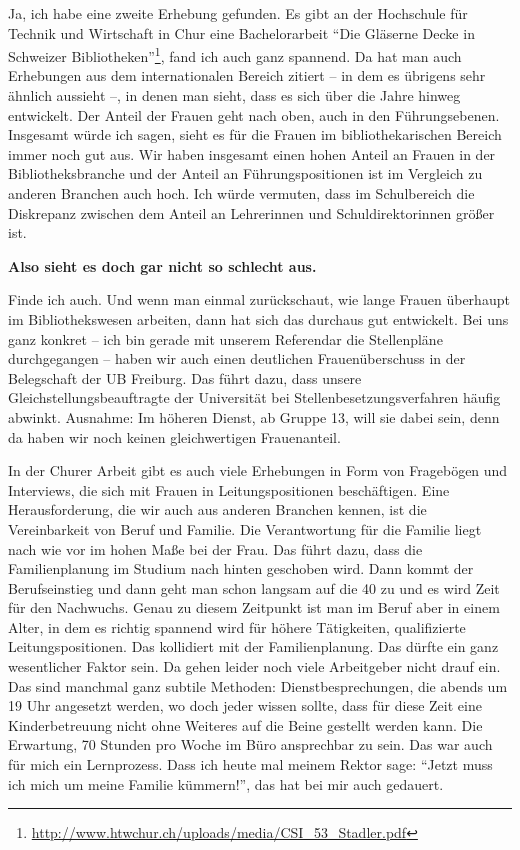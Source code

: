 \documentclass[a4paper,
fontsize=11pt,
oneside,
numbers=noperiodatend,
parskip=half-,
bibliography=totoc,
final
]{scrartcl}
\begin{document}
Ja, ich habe eine zweite Erhebung gefunden. Es gibt an der Hochschule
für Technik und Wirtschaft in Chur eine Bachelorarbeit \enquote{Die
Gläserne Decke in Schweizer Bibliotheken}\footnote{\url{http://www.htwchur.ch/uploads/media/CSI_53_Stadler.pdf}},
fand ich auch ganz spannend. Da hat man auch Erhebungen aus dem
internationalen Bereich zitiert -- in dem es übrigens sehr ähnlich
aussieht --, in denen man sieht, dass es sich über die Jahre hinweg
entwickelt. Der Anteil der Frauen geht nach oben, auch in den
Führungsebenen. Insgesamt würde ich sagen, sieht es für die Frauen im
bibliothekarischen Bereich immer noch gut aus. Wir haben insgesamt einen
hohen Anteil an Frauen in der Bibliotheksbranche und der Anteil an
Führungspositionen ist im Vergleich zu anderen Branchen auch hoch. Ich
würde vermuten, dass im Schulbereich die Diskrepanz zwischen dem Anteil
an Lehrerinnen und Schuldirektorinnen größer ist.

\textbf{Also sieht es doch gar nicht so schlecht aus.}

Finde ich auch. Und wenn man einmal zurückschaut, wie lange Frauen
überhaupt im Bibliothekswesen arbeiten, dann hat sich das durchaus gut
entwickelt. Bei uns ganz konkret -- ich bin gerade mit unserem
Referendar die Stellenpläne durchgegangen -- haben wir auch einen
deutlichen Frauenüberschuss in der Belegschaft der UB Freiburg. Das
führt dazu, dass unsere Gleichstellungsbeauftragte der Universität bei
Stellenbesetzungsverfahren häufig abwinkt. Ausnahme: Im höheren Dienst,
ab Gruppe 13, will sie dabei sein, denn da haben wir noch keinen
gleichwertigen Frauenanteil.

In der Churer Arbeit gibt es auch viele Erhebungen in Form von
Fragebögen und Interviews, die sich mit Frauen in Leitungspositionen
beschäftigen. Eine Herausforderung, die wir auch aus anderen Branchen
kennen, ist die Vereinbarkeit von Beruf und Familie. Die Verantwortung
für die Familie liegt nach wie vor im hohen Maße bei der Frau. Das führt
dazu, dass die Familienplanung im Studium nach hinten geschoben wird.
Dann kommt der Berufseinstieg und dann geht man schon langsam auf die 40
zu und es wird Zeit für den Nachwuchs. Genau zu diesem Zeitpunkt ist man
im Beruf aber in einem Alter, in dem es richtig spannend wird für höhere
Tätigkeiten, qualifizierte Leitungspositionen. Das kollidiert mit der
Familienplanung. Das dürfte ein ganz wesentlicher Faktor sein. Da gehen
leider noch viele Arbeitgeber nicht drauf ein. Das sind manchmal ganz
subtile Methoden: Dienstbesprechungen, die abends um 19 Uhr angesetzt
werden, wo doch jeder wissen sollte, dass für diese Zeit eine
Kinderbetreuung nicht ohne Weiteres auf die Beine gestellt werden kann.
Die Erwartung, 70 Stunden pro Woche im Büro ansprechbar zu sein. Das war
auch für mich ein Lernprozess. Dass ich heute mal meinem Rektor sage:
\enquote{Jetzt muss ich mich um meine Familie kümmern!}, das hat bei mir
auch gedauert.
\end{document}
